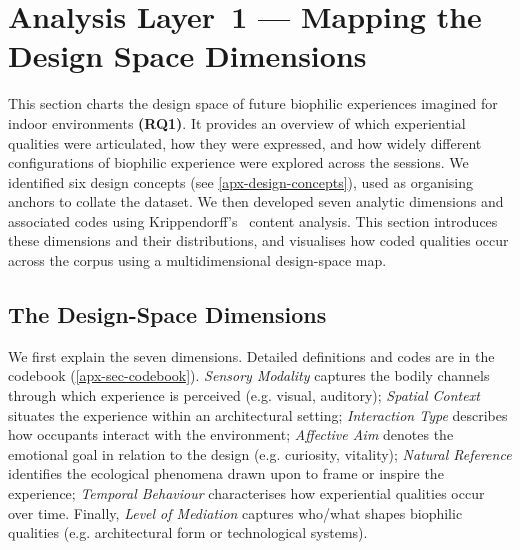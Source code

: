 \section{Analysis Layer~1 ---  Mapping the Design Space Dimensions}
\label{sec:ch5-layer1}

This section charts the design space of future biophilic experiences imagined for indoor environments \textbf{(RQ1)}. It provides an overview of which experiential qualities were articulated, how they were expressed, and how widely different configurations of biophilic experience were explored across the sessions. We identified six design concepts (see \autoref{apx-design-concepts}), used as organising anchors to collate the dataset. We then developed seven analytic dimensions and associated codes using Krippendorff's~\cite{krippendorff2018content} content analysis. This section introduces these dimensions and their distributions, and visualises how coded qualities occur across the corpus using a multidimensional design-space map.

\subsection{The Design-Space Dimensions}
We first explain the seven dimensions. Detailed definitions and codes are in the codebook (\autoref{apx-sec-codebook}). \emph{Sensory Modality} captures the bodily channels through which experience is perceived (e.g. visual, auditory); \emph{Spatial Context} situates the experience within an architectural setting; \emph{Interaction Type} describes how occupants interact with the environment; \emph{Affective Aim} denotes the emotional goal in relation to the design (e.g. curiosity, vitality); \emph{Natural Reference} identifies the ecological phenomena drawn upon to frame or inspire the experience; \emph{Temporal Behaviour} characterises how experiential qualities occur over time. Finally, \emph{Level of Mediation} captures who/what shapes biophilic qualities (e.g. architectural form or technological systems). 


